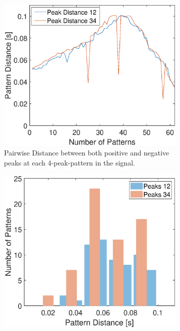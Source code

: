 \begin{figure}[h]
	\begin{subfigure}[l]{0.49\textwidth} 
		\centering
		\includegraphics[clip,trim={0mm 0mm 0mm 0mm}, width=1.1\linewidth]{Ressourcen/Results/Measurement/12_34_abs}
		\caption{Pairwise Distance between both positive and negative peaks at each 4-peak-pattern in the signal.}
		\label{fig:exp:pattern:12:abs}
	\end{subfigure}
	\hfill
	\begin{subfigure}[r]{0.49\textwidth} 
		\centering
		\includegraphics[clip,trim={0mm 0mm 0mm 0mm}, width=1.1\linewidth]{Ressourcen/Results/Measurement/12_34_hist}

\end{subfigure}
\end{figure}
